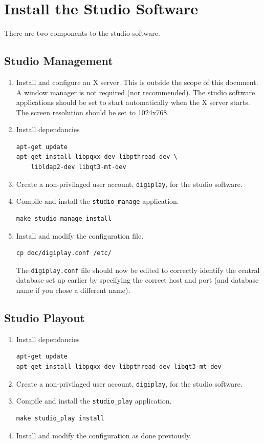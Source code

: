 \documentclass[a4paper,12pt]{report}
\numberwithin{equation}{section}
\begin{document}
\section{Install the Studio Software}
There are two components to the studio software. 
\subsection{Studio Management}
\begin{enumerate}
\item Install and configure an X server. This is outside the scope of this document. A window manager is not required (nor recommended). The studio software applications should be set to start automatically when the X server starts. The screen resolution should be set to 1024x768.
\item Install dependancies
\begin{lstlisting}
apt-get update
apt-get install libpqxx-dev libpthread-dev \
	libldap2-dev libqt3-mt-dev
\end{lstlisting}
\item Create a non-privilaged user account, \texttt{digiplay}, for the studio software.
\item Compile and install the \texttt{studio\_manage} application.
\begin{lstlisting}
make studio_manage install
\end{lstlisting}
\item Install and modify the configuration file.
\begin{lstlisting}
cp doc/digiplay.conf /etc/
\end{lstlisting}
The \texttt{digiplay.conf} file should now be edited to correctly identify the central database set up earlier by specifying the correct host and port (and database name if you chose a different name).
\end{enumerate}
\subsection{Studio Playout}
\begin{enumerate}
\item Install dependancies
\begin{lstlisting}
apt-get update
apt-get install libpqxx-dev libpthread-dev libqt3-mt-dev
\end{lstlisting}
\item Create a non-privilaged user account, \texttt{digiplay}, for the studio software.
\item Compile and install the \texttt{studio\_play} application.
\begin{lstlisting}
make studio_play install
\end{lstlisting}
\item Install and modify the configuration as done previously.
\end{enumerate}
\end{document}
